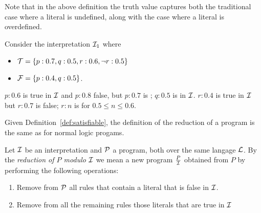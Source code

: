 
Note that in the above definition the truth value \ourU{} captures
both the traditional case where a literal is undefined, along with the
case where a literal is overdefined.

\begin{example} 
  Consider the interpretation $\cI_1$ where
\begin{itemize}
\item  $\cT = \{p:0.7,q:0.5, r:0.6,\ourneg r:0.5\}$
\item $\cF = \{p:0.4, q:0.5\}$.
\end{itemize}
$p:0.6$ is true in $\cI$ and $p:0.8$ false, but $p:0.7$ is \ourU ;
$q:0.5$ is \ourU{} in $\cI$. $r:0.4$ is true in $\cI$ but $r:0.7$ is
false; $r:n$ is \ourU{} for $0.5 \leq n \leq 0.6$.
\end{example}



Given Definition~\ref{def:satisfiable}, the definition of the
reduction of a program is the same as for normal logic progams.

\begin{definition} \label{def:reduction}
%                                                                                
Let $\cI$ be an interpretation and $\cP$ a program, both over the same
langage $\cL$.  By the {\em reduction of $P$ modulo $\cI$} we mean a
new program $\frac{P}{\cI}$ obtained from $P$ by performing the
following operations:
\begin{enumerate}
\item Remove from $\cP$ all rules that contain a literal that is false
  in $\cI$.
\item Remove from all the remaining rules those literals that are true
  in $\cI$
\end{enumerate}
\end{definition}

